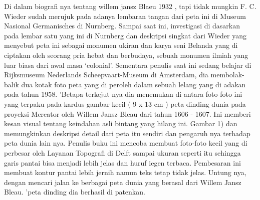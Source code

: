Di dalam biografi nya tentang willem jansz Blaeu 1932 , tapi tidak mungkin F. C. Wieder sudah merujuk pada adanya lembaran tangan dari 
peta ini di Museum Nasional Germanisches di Nurnberg. Sampai saat ini, investigasi di dasarkan pada lembar satu yang ini di Nurnberg dan deskripsi singkat dari Wieder yang menyebut peta ini sebagai monumen ukiran 
dan karya seni Belanda yang di ciptakan oleh seorang pria hebat dan berbudaya, sebuah monumen ilmiah yang luar biasa dari awal masa ‘colonial'. 
Sementara penulis saat ini sedang belajar di Rijksmuseum Nederlands Scheepvaart-Museum di Amsterdam, 
dia membolak-balik dua kotak foto peta yang di peroleh dalam sebuah lelang yang di adakan pada tahun 1958. 
'Betapa terkejut nya dia menemukan di antara foto-foto ini yang terpaku pada kardus gambar kecil ( 9 x 13 cm ) 
peta dinding dunia pada proyeksi Mercator oleh Willem Jansz Bleau dari tahun 1606 - 1607. 
Ini memberi kesan visual tentang keindahan asli bintang yang hilang ini. 
Gambar 1) dan memungkinkan deskripsi detail dari peta itu sendiri dan pengaruh nya terhadap peta dunia lain nya. 
Penulis buku ini mencoba membuat foto-foto kecil yang di perbesar oleh Layanan Topografi di Delft sampai ukuran seperti itu 
sehingga garis pantai bisa menjadi lebih jelas dan huruf iegen terbaca. 
Pembesaran ini membuat kontur pantai lebih jernih namun teks tetap tidak jelas. 
Untung nya, dengan mencari jalan ke berbagai peta dunia yang berasal dari Willem Jansz Bleau. 'peta dinding dia berhasil di patenkan. 

\cite{campbell1976descriptive}

